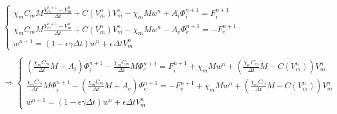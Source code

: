 \documentclass[a4paper]{article}
\theoremstyle{definition}
\begin{document}
\begin{equation}
\begin{gathered}
\begin{cases}
\chi_m C_m M\frac{V_m^{n+1} - V_m^n}{\Delta t} + C(V_m^n)V_m^n -\chi_mMw^n + A_i \Phi_i^{n+1}= F_i^{n+1} \\
\chi_m C_m M\frac{V_m^{n+1} - V_m^n}{\Delta t} + C(V_m^n)V_m^n -\chi_mMw^n - A_e \Phi_e^{n+1}= -F_e^{n+1} \\
w^{n+1} = (1-\epsilon \gamma \Delta t) w^n + \epsilon \Delta t V_m^n
\end{cases}
\\ \\  
\Rightarrow
\begin{cases}
\left( \frac{\chi_m C_m}{\Delta t} M + A_i \right ) \Phi_i^{n+1} - \frac{\chi_m C_m}{\Delta t} M \Phi_e^{n+1} = F_i^{n+1} + \chi_m M w^n + \left( \frac{\chi_m C_m}{\Delta t} M- C(V_m^n)\right) V_m^n \\ 
\frac{\chi_m C_m}{\Delta t} M  \Phi_i^{n+1} - \left(\frac{\chi_m C_m}{\Delta t} M + A_e \right) \Phi_e^{n+1} =  -F_e^{n+1} + \chi_m M w^n + \left( \frac{\chi_m C_m}{\Delta t} M- C(V_m^n)\right) V_m^n \\
w^{n+1} = (1-\epsilon \gamma \Delta t) w^n + \epsilon \Delta tV_m^n
\end{cases}
\end{gathered} 
\end{equation}
\vspace{3mm}
\end{document}
